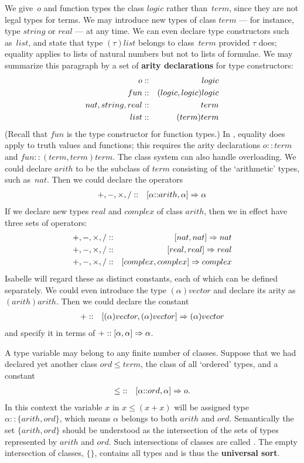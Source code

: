 We give~$o$ and function types the class $logic$ rather than~$term$, since
they are not legal types for terms. We may introduce new types of class
$term$ --- for instance, type $string$ or $real$ --- at any time. We can
even declare type constructors such as~$list$, and state that type
$(\tau)list$ belongs to class~$term$ provided $\tau$ does; equality
applies to lists of natural numbers but not to lists of formulae. We may
summarize this paragraph by a set of {\bf arity declarations} for type
constructors:
\begin{eqnarray*}
    \index{*o type}\index{*fun type}
    o             & :: & logic \\
    fun           & :: & (logic,logic)logic \\
    nat, string, real     & :: & term \\
    list          & :: & (term)term
\end{eqnarray*}
(Recall that $fun$ is the type constructor for function types.)
In , equality does apply to truth values and
functions; this requires the arity declarations ${o::term}$
and ${fun::(term,term)term}$. The class system can also handle
overloading. We could declare $arith$ to be the
subclass of $term$ consisting of the `arithmetic' types, such as~$nat$.
Then we could declare the operators
\begin{eqnarray*}
{+}
    ,{-},{\times},{/}  & :: & [\alpha{::}arith,\alpha]\Rightarrow \alpha
\end{eqnarray*}
If we declare new types $real$ and $complex$ of class $arith$, then we
in effect have three sets of operators:
\begin{eqnarray*}
{+}
    ,{-},{\times},{/}  & :: & [nat,nat]\Rightarrow nat \\
    {+},{-},{\times},{/}  & :: & [real,real]\Rightarrow real \\
    {+},{-},{\times},{/}  & :: & [complex,complex]\Rightarrow complex
\end{eqnarray*}
Isabelle will regard these as distinct constants, each of which can be defined
separately. We could even introduce the type $(\alpha)vector$ and declare
its arity as $(arith)arith$. Then we could declare the constant
\begin{eqnarray*}
{+}
    & :: & [(\alpha)vector,(\alpha)vector]\Rightarrow (\alpha)vector
\end{eqnarray*}
and specify it in terms of ${+} :: [\alpha,\alpha]\Rightarrow \alpha$.

A type variable may belong to any finite number of classes. Suppose that
we had declared yet another class $ord \le term$, the class of all
`ordered' types, and a constant
\begin{eqnarray*}
{\le}
    & :: & [\alpha{::}ord,\alpha]\Rightarrow o.
\end{eqnarray*}
In this context the variable $x$ in $x \le (x+x)$ will be assigned type
$\alpha{::}\{arith,ord\}$, which means $\alpha$ belongs to both $arith$ and
$ord$. Semantically the set $\{arith,ord\}$ should be understood as the
intersection of the sets of types represented by $arith$ and $ord$. Such
intersections of classes are called . The empty
intersection of classes, $\{\}$, contains all types and is thus the {\bf
universal sort}.

